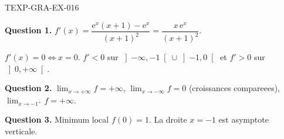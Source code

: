 \begin{corrige}{TEXP-GRA-EX-016}

\textbf{Question 1.} $f'(x) = \dfrac{\mathrm{e}^x(x+1) - \mathrm{e}^x}{(x+1)^2} = \dfrac{x\,\mathrm{e}^x}{(x+1)^2}$.


$f'(x) = 0 \iff x = 0$. $f' < 0$ sur $\left]-\infty, -1\right[ \cup \left]-1, 0\right[$ et $f' > 0$ sur $\left]0, +\infty\right[$.

\textbf{Question 2.} $\lim_{x \to +\infty} f = +\infty$, $\lim_{x \to -\infty} f = 0$ (croissances compareees), $\lim_{x \to -1^+} f = +\infty$.

\textbf{Question 3.} Minimum local $f(0) = 1$. La droite $x = -1$ est asymptote verticale.

\end{corrige}
